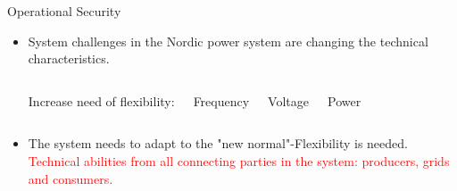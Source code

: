 \documentclass{beamer}
\begin{document}
\begin{frame}{Operational Security}
\begin{itemize}
\item<1-> System challenges in the Nordic power system are changing the technical characteristics.

 \begin{columns}
    \begin{block}{}
Increase need of flexibility:
\end{block}


        \begin{alertblock}{}
        \centering
Frequency 
\end{alertblock}
        \begin{alertblock}{}
        \centering
Voltage 
\end{alertblock}
        \begin{alertblock}{}
        \centering
Power 
\end{alertblock}
\end{columns}
\item<2-> The system needs to adapt to the "new normal"-Flexibility is needed. \textcolor{red}{Technical abilities from all connecting parties in the system: producers, grids and
consumers.}


\end{itemize}
\end{frame}
\end{document}
